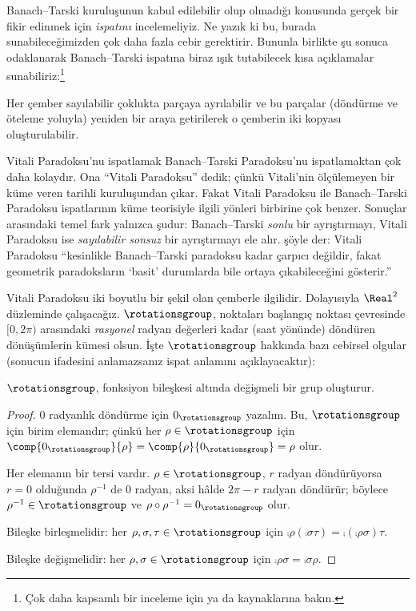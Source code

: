 \documentclass[../../../include/open-logic-section]{subfiles}
\begin{document}

Banach--Tarski kuruluşunun kabul edilebilir olup olmadığı konusunda gerçek
bir fikir edinmek için \emph{ispatını} incelemeliyiz. Ne yazık ki bu,
burada sunabileceğimizden çok daha fazla cebir gerektirir. Bununla birlikte
şu sonuca odaklanarak Banach--Tarski ispatına biraz ışık tutabilecek kısa
açıklamalar sunabiliriz:\footnote{Çok daha kapsamlı bir inceleme için
\cite{Weston2003} ya da \cite{Wagon2016} kaynaklarına bakın.}

\begin{thm}
Her çember sayılabilir çoklukta parçaya ayrılabilir ve bu parçalar
(döndürme ve öteleme yoluyla) yeniden bir araya getirilerek o çemberin iki
kopyası oluşturulabilir.
\end{thm}

Vitali Paradoksu'nu ispatlamak Banach--Tarski Paradoksu'nu ispatlamaktan
çok daha kolaydır. Ona ``Vitali Paradoksu'' dedik; çünkü Vitali'nin
ölçülemeyen bir küme veren \citeyear{Vitali1905} tarihli kuruluşundan
çıkar. Fakat Vitali Paradoksu ile Banach--Tarski Paradoksu ispatlarının
küme teorisiyle ilgili yönleri birbirine çok benzer. Sonuçlar arasındaki
temel fark yalnızca şudur: Banach--Tarski \emph{sonlu} bir ayrıştırmayı,
Vitali Paradoksu ise \emph{sayılabilir sonsuz} bir ayrıştırmayı ele alır.
\citet{Weston2003} şöyle der: Vitali Paradoksu ``kesinlikle Banach--Tarski
paradoksu kadar çarpıcı değildir, fakat geometrik paradoksların `basit'
durumlarda bile ortaya çıkabileceğini gösterir.''

Vitali Paradoksu iki boyutlu bir şekil olan çemberle ilgilidir. Dolayısıyla
$\Real^2$ düzleminde çalışacağız. $\rotationsgroup$, noktaları başlangıç
noktası çevresinde $[0,2\pi)$ arasındaki \emph{rasyonel} radyan değerleri
kadar (saat yönünde) döndüren dönüşümlerin kümesi olsun. İşte
$\rotationsgroup$ hakkında bazı cebirsel olgular (sonucun ifadesini
anlamazsanız ispat anlamını açıklayacaktır):

\begin{lem}
$\rotationsgroup$, fonksiyon bileşkesi altında değişmeli bir {grup}
oluşturur.
\end{lem}

\begin{proof}
$0$ radyanlık döndürme için $0_{\rotationsgroup}$ yazalım. Bu,
$\rotationsgroup$ için birim elemandır; çünkü her
$\rho\in\rotationsgroup$ için
$\comp{0_{\rotationsgroup}}{\rho}=\comp{\rho}{0_{\rotationsgroup}}=
\rho$ olur.

Her elemanın bir tersi vardır. $\rho\in\rotationsgroup$, $r$ radyan
döndürüyorsa $r=0$ olduğunda $\rho^{-1}$ de $0$ radyan, aksi hâlde
$2\pi-r$ radyan döndürür; böylece $\rho^{-1}\in\rotationsgroup$ ve
$\rho\circ\rho^{-1}=0_\rotationsgroup$ olur.

Bileşke birleşmelidir: her
$\rho,\sigma,\tau\in\rotationsgroup$ için
$\comp{\rho}{(\comp{\sigma}{\tau})}=
\comp{(\comp{\rho}{\sigma})}{\tau}$.

Bileşke değişmelidir: her $\rho,\sigma\in\rotationsgroup$ için
$\comp{\rho}{\sigma}=\comp{\sigma}{\rho}$.
\end{proof}
\end{document}
